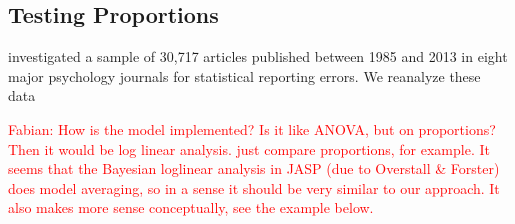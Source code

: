 \documentclass[11pt,a4paper]{article}
\theoremstyle{definition} %
\theoremstyle{case}
\newcommand{\FD}[1]{\textcolor{red}{Fabian: #1 }}
\begin{document}

\subsection{Testing Proportions}
\textcite{nuijten2016prevalence} investigated a sample of 30,717 articles published between 1985 and 2013 in eight major psychology journals for statistical reporting errors. We reanalyze these data 

\FD{How is the model implemented? Is it like ANOVA, but on proportions? Then it would be log linear analysis. \textcite{gopalan1998bayesian} just compare proportions, for example. It seems that the Bayesian loglinear analysis in JASP (due to Overstall \& Forster) does model averaging, so in a sense it should be very similar to our approach. It also makes more sense conceptually, see the example below.}
\end{document}
